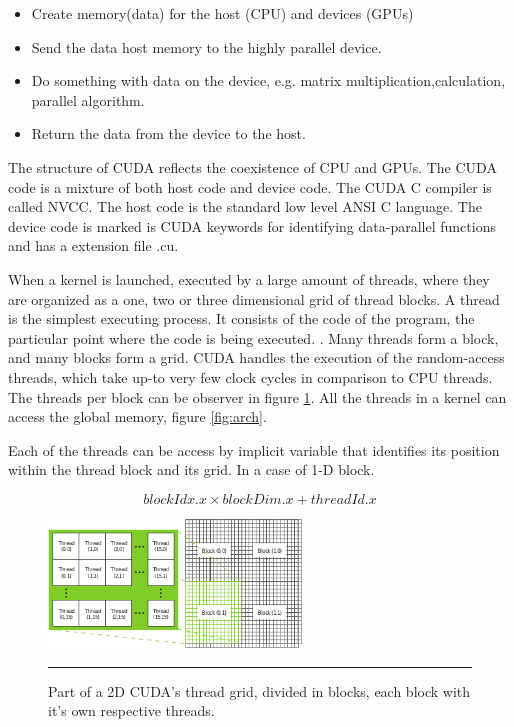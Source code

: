 \begin{itemize}
\item Create memory(data) for the host (CPU) and devices (GPUs)
\item Send the data host memory to the highly parallel device.
\item Do something with data on the device, e.g. matrix multiplication,calculation, parallel algorithm.
\item Return the data from the device to the host.
\end{itemize}

The structure of CUDA reflects the coexistence of CPU and GPUs. The CUDA code is a mixture of both host code and device code. The CUDA C compiler is called NVCC. The host code is the standard low level ANSI C language. The device code is marked is CUDA keywords for identifying data-parallel functions and has a extension file .cu.

When a kernel is launched, executed by a large amount of threads, where they are organized as a one, two or three dimensional grid of thread blocks. A thread is the simplest executing process. It consists of the code of the program, the particular point where the code is being executed. \cite{hwu}. Many threads form a block, and many blocks form a grid. CUDA handles the execution of the random-access threads, which take up-to very few clock cycles in comparison to CPU threads. The threads per block can be observer in figure \ref{fig:grid}. All the threads in a kernel can access the global memory, figure \ref{fig:arch}.

Each of the threads can be access by implicit variable that identifies its position within the thread block and its grid. In a case of 1-D block. \cite{example}

$$blockIdx.x \times blockDim.x + threadId.x$$

\begin{figure}[htbp]
	\centering
		\includegraphics[width=0.6\textwidth]{Figures/grid.png}
		\rule{35em}{0.5pt}
	\caption[Part of the CUDA's 2D grid]{Part of a 2D CUDA's thread grid, divided in blocks, each block with it’s own respective threads.}
	\label{fig:grid}
\end{figure}

